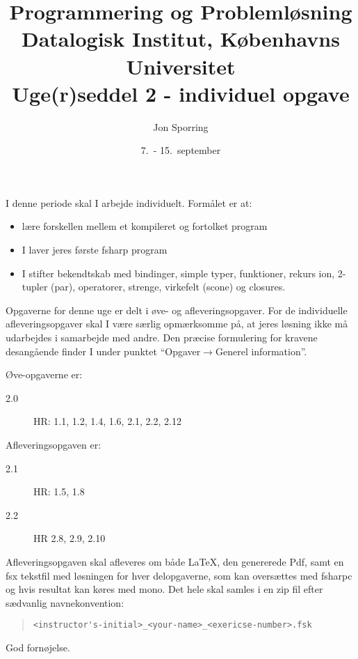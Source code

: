 \documentclass[a4paper,12pt]{article}
\title{Programmering og Problemløsning\\Datalogisk Institut,
  Københavns Universitet\\Uge(r)seddel 2 - individuel opgave}
\author{Jon Sporring}
\date{7.\ - 15.\ september}
\begin{document}
\maketitle

I denne periode skal I arbejde individuelt. Formålet er at:
\begin{itemize}
\item lære forskellen mellem et kompileret og fortolket program
\item I laver jeres første fsharp program
\item I stifter bekendtskab med bindinger, simple typer, funktioner,
  rekurs ion, 2-tupler (par), operatorer, strenge, virkefelt (scone) og closures.
\end{itemize}

Opgaverne for denne uge er delt i øve- og afleveringsopgaver. For de individuelle afleveringsopgaver skal I være særlig opmærksomme på, at jeres løsning ikke må udarbejdes i samarbejde med andre. Den præcise formulering for kravene desangående finder I under punktet "`Opgaver$\rightarrow$Generel information"'.

Øve-opgaverne er:
\begin{description}
\item[2.0] HR: 1.1, 1.2, 1.4, 1.6, 2.1, 2.2, 2.12
\end{description}

Afleveringsopgaven er:
\begin{description}
\item[2.1] HR: 1.5, 1.8
\item[2.2] HR 2.8, 2.9, 2.10
\end{description}
Afleveringsopgaven skal afleveres om både LaTeX, den genererede Pdf, samt en fsx tekstfil med løsningen for hver delopgaverne, som kan oversættes med fsharpc og hvis resultat kan køres med mono. Det hele skal samles i en zip fil efter sædvanlig navnekonvention:
\begin{quote}
  \lstinline|<instructor's-initial>_<your-name>_<exericse-number>.fsk|
\end{quote}

\flushright God fornøjelse.
\end{document}

